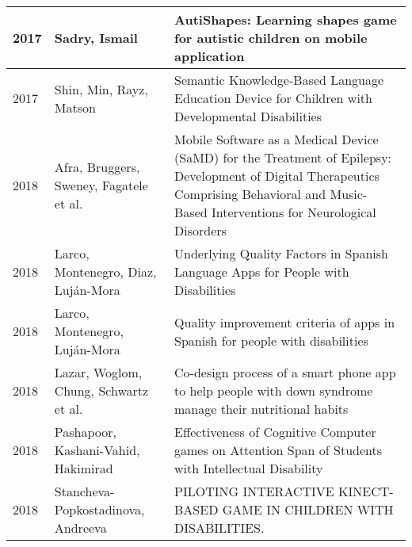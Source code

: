 \documentclass[utf8,english]{gradu3}
\begin{document}
\begin{longtable}{|>{\scriptsize}l|>{\scriptsize}p{3cm}|>{\scriptsize}p{10.4cm}|}
  2017          & Sadry, Ismail                                                & AutiShapes: Learning shapes game for autistic children on mobile application                                                                                                                                                   \\ \hline
  2017          & Shin, Min, Rayz, Matson                                      & Semantic Knowledge-Based Language Education Device for Children with Developmental Disabilities                                                                                                                                \\ \hline
  2018          & Afra, Bruggers, Sweney, Fagatele et al.                      & Mobile Software as a Medical Device (SaMD) for the Treatment of Epilepsy: Development of Digital Therapeutics Comprising Behavioral and Music-Based Interventions for Neurological Disorders                                   \\ \hline
  2018          & Larco, Montenegro, Diaz, Luján-Mora                          & Underlying Quality Factors in Spanish Language Apps for People with Disabilities                                                                                                                                               \\ \hline
  2018          & Larco, Montenegro, Luján-Mora                                & Quality improvement criteria of apps in Spanish for people with disabilities                                                                                                                                                   \\ \hline
  2018          & Lazar, Woglom, Chung, Schwartz et al.                        & Co-design process of a smart phone app to help people with down syndrome manage their nutritional habits                                                                                                                       \\ \hline
  2018          & Pashapoor, Kashani-Vahid, Hakimirad                          & Effectiveness of Cognitive Computer games on Attention Span of Students with Intellectual Disability                                                                                                                           \\ \hline
  2018          & Stancheva-Popkostadinova, Andreeva                           & PILOTING INTERACTIVE KINECT-BASED GAME IN CHILDREN WITH DISABILITIES.                                                                                                                                                          \\ \hline

\end{longtable}
\end{document}
